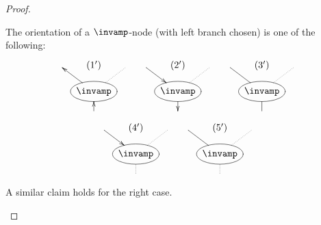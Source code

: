 \begin{proof}
    \begin{claim*}
        The orientation of a \( \llpar \)-node (with left branch chosen) is one of the following:
        \begin{gather*}
            \xymatrix@C=3mm@R=3mm{
                & \tiny (1') & \\
                &
                *++[o][F-]{\llpar} \ar[ul] \ar@{..}[ur] &
                \\
                & \ar[u] &
            }
            \quad
            \xymatrix@C=3mm@R=3mm{
                \ar[dr] & \tiny (2') & \\
                &
                *++[o][F-]{\llpar} \ar[d] \ar@{..}[ur] &
                \\
                & &
            }
            \quad
            \xymatrix@C=3mm@R=3mm{
                & \tiny (3') & \\
                &
                *++[o][F-]{\llpar} \ar@{-}[ul] \ar@{-}[d] \ar@{..}[ur] &
                \\
                & &
            }
            \\
            \xymatrix@C=3mm@R=3mm{
                \ar[dr] & \tiny (4') & \\
                &
                *++[o][F-]{\llpar} \ar@{..}[ur] &
                \\
                & \ar@{..}[u] &
            }
            \quad
            \xymatrix@C=3mm@R=3mm{
                & \tiny (5') & \\
                &
                *++[o][F-]{\llpar} \ar@{-}[ul] \ar@{..}[ur] &
                \\
                & \ar@{..}[u]&
            }
        \end{gather*}
        A similar claim holds for the right case.

\end{claim*}
\end{proof}
